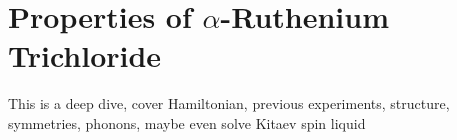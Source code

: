 \chapter{Properties of $\alpha$-Ruthenium Trichloride}
This is a deep dive, cover Hamiltonian, previous experiments, structure, symmetries, phonons, maybe even solve Kitaev spin liquid